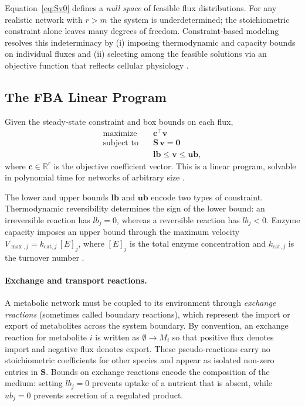 Equation~\eqref{eq:Sv0} defines a \emph{null space} of feasible flux
distributions.  For any realistic network with $r > m$ the system is
underdetermined; the stoichiometric constraint alone leaves many degrees of
freedom.  Constraint-based modeling resolves this indeterminacy by (i) imposing
thermodynamic and capacity bounds on individual fluxes and (ii) selecting
among the feasible solutions via an objective function that reflects cellular
physiology \cite{Bordbar2014}.

\subsection{The FBA Linear Program}

Given the steady-state constraint and box bounds on each flux,
\begin{equation}\label{eq:fba_lp}
  \begin{aligned}
    \text{maximize}   \quad & \mathbf{c}^{\!\top}\mathbf{v} \\
    \text{subject to} \quad & \mathbf{S}\,\mathbf{v} = \mathbf{0} \\
                            & \mathbf{lb} \leq \mathbf{v} \leq \mathbf{ub},
  \end{aligned}
\end{equation}
where $\mathbf{c} \in \mathbb{R}^{r}$ is the objective coefficient vector.
This is a linear program, solvable in polynomial time for networks of arbitrary
size \cite{Orth2010,Heirendt2019}.

The lower and upper bounds $\mathbf{lb}$ and $\mathbf{ub}$ encode two types
of constraint.  Thermodynamic reversibility determines the sign of the lower
bound: an irreversible reaction has $lb_{j} = 0$, whereas a reversible
reaction has $lb_{j} < 0$.  Enzyme capacity imposes an upper bound through
the maximum velocity $V_{\max,j} = k_{\text{cat},j}\,[E]_{j}$, where
$[E]_{j}$ is the total enzyme concentration and $k_{\text{cat},j}$ is the
turnover number \cite{Milo2010}.

\paragraph{Exchange and transport reactions.}
A metabolic network must be coupled to its environment through
\emph{exchange reactions} (sometimes called boundary reactions), which represent
the import or export of metabolites across the system boundary.  By convention,
an exchange reaction for metabolite $i$ is written as $\emptyset \to M_i$ so
that positive flux denotes import and negative flux denotes export.  These
pseudo-reactions carry no stoichiometric coefficients for other species and
appear as isolated non-zero entries in $\mathbf{S}$.  Bounds on exchange
reactions encode the composition of the medium: setting $lb_{j} = 0$ prevents
uptake of a nutrient that is absent, while $ub_{j} = 0$ prevents secretion of
a regulated product.

